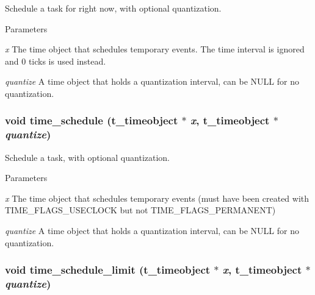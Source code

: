 Schedule a task for right now, with optional quantization. 
\begin{DoxyParams}{Parameters}
\item[{\em x}]The time object that schedules temporary events. The time interval is ignored and 0 ticks is used instead. \item[{\em quantize}]A time object that holds a quantization interval, can be NULL for no quantization. \end{DoxyParams}
\hypertarget{group__time_gae46ab99a9732990170ce0e27fb744c4b}{
\subsubsection[{time\_\-schedule}]{\setlength{\rightskip}{0pt plus 5cm}void time\_\-schedule ({\bf t\_\-timeobject} $\ast$ {\em x}, \/  {\bf t\_\-timeobject} $\ast$ {\em quantize})}}
\label{group__time_gae46ab99a9732990170ce0e27fb744c4b}


Schedule a task, with optional quantization. 
\begin{DoxyParams}{Parameters}
\item[{\em x}]The time object that schedules temporary events (must have been created with TIME\_\-FLAGS\_\-USECLOCK but not TIME\_\-FLAGS\_\-PERMANENT) \item[{\em quantize}]A time object that holds a quantization interval, can be NULL for no quantization. \end{DoxyParams}
\hypertarget{group__time_ga96226d122f6f0d7e2e1ebe47b06d00c5}{
\subsubsection[{time\_\-schedule\_\-limit}]{\setlength{\rightskip}{0pt plus 5cm}void time\_\-schedule\_\-limit ({\bf t\_\-timeobject} $\ast$ {\em x}, \/  {\bf t\_\-timeobject} $\ast$ {\em quantize})}}
\label{group__time_ga96226d122f6f0d7e2e1ebe47b06d00c5}


